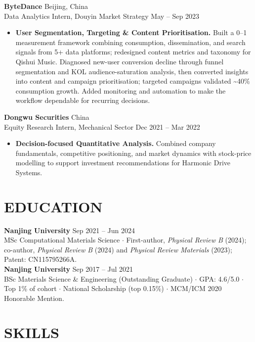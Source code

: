 \documentclass[a4paper,10pt]{article}
\begin{document}
\vspace{1pt}
\noindent\textbf{ByteDance} \hfill Beijing, China\\
Data Analytics Intern, Douyin Market Strategy \hfill May -- Sep 2023
\begin{itemize}
    \item \textbf{User Segmentation, Targeting \& Content Prioritisation.} Built a 0--1 measurement framework combining consumption, dissemination, and search signals from 5+ data platforms; redesigned content metrics and taxonomy for Qishui Music. Diagnosed new-user conversion decline through funnel segmentation and KOL audience-saturation analysis, then converted insights into content and campaign prioritisation; targeted campaigns validated \textasciitilde40\% consumption growth. Added monitoring and automation to make the workflow dependable for recurring decisions.
\end{itemize}

\vspace{1pt}
\noindent\textbf{Dongwu Securities} \hfill China\\
Equity Research Intern, Mechanical Sector \hfill Dec 2021 -- Mar 2022
\begin{itemize}
    \item \textbf{Decision-focused Quantitative Analysis.} Combined company fundamentals, competitive positioning, and market dynamics with stock-price modelling to support investment recommendations for Harmonic Drive Systems.
\end{itemize}

\section{EDUCATION}

\noindent\textbf{Nanjing University} \hfill Sep 2021 -- Jun 2024\\
MSc Computational Materials Science \;$\cdot$\; First-author, \textit{Physical Review B} (2024); co-author, \textit{Physical Review B} (2024) and \textit{Physical Review Materials} (2023); Patent: CN115795266A.\\[1pt]
\noindent\textbf{Nanjing University} \hfill Sep 2017 -- Jul 2021\\
BSc Materials Science \& Engineering (Outstanding Graduate) \;$\cdot$\; GPA: 4.6/5.0 \;$\cdot$\; Top 1\% of cohort \;$\cdot$\; National Scholarship (top 0.15\%) \;$\cdot$\; MCM/ICM 2020 Honorable Mention.

\section{SKILLS}
\end{document}
